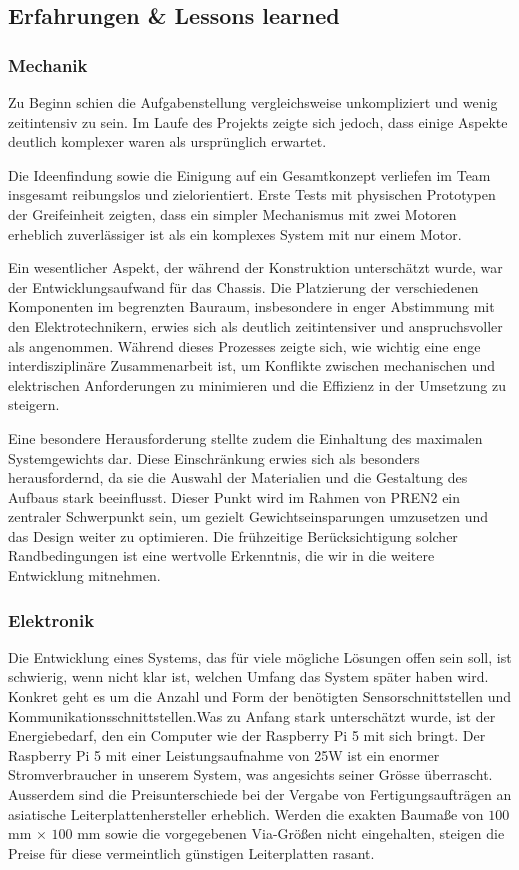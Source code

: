 \documentclass[main.tex]{subfiles} %
\begin{document}
\subsection{Erfahrungen \& Lessons learned}

\subsubsection{Mechanik}

Zu Beginn schien die Aufgabenstellung vergleichsweise unkompliziert und wenig 
zeitintensiv zu sein. Im Laufe des Projekts zeigte sich jedoch, dass einige 
Aspekte deutlich komplexer waren als ursprünglich erwartet.

Die Ideenfindung sowie die Einigung auf ein Gesamtkonzept verliefen im Team 
insgesamt reibungslos und zielorientiert. Erste Tests mit physischen Prototypen 
der Greifeinheit zeigten, dass ein simpler Mechanismus mit zwei Motoren erheblich 
zuverlässiger ist als ein komplexes System mit nur einem Motor.

Ein wesentlicher Aspekt, der während der Konstruktion unterschätzt wurde, war 
der Entwicklungsaufwand für das Chassis. Die Platzierung der verschiedenen 
Komponenten im begrenzten Bauraum, insbesondere in enger Abstimmung mit den 
Elektrotechnikern, erwies sich als deutlich zeitintensiver und anspruchsvoller 
als angenommen. Während dieses Prozesses zeigte sich, wie wichtig eine enge 
interdisziplinäre Zusammenarbeit ist, um Konflikte zwischen mechanischen und 
elektrischen Anforderungen zu minimieren und die Effizienz in der Umsetzung 
zu steigern.

Eine besondere Herausforderung stellte zudem die Einhaltung des maximalen 
Systemgewichts dar. Diese Einschränkung erwies sich als besonders 
herausfordernd, da sie die Auswahl der Materialien und die Gestaltung des 
Aufbaus stark beeinflusst. Dieser Punkt wird im Rahmen von PREN2 ein zentraler 
Schwerpunkt sein, um gezielt Gewichtseinsparungen umzusetzen und das Design 
weiter zu optimieren. Die frühzeitige Berücksichtigung solcher Randbedingungen 
ist eine wertvolle Erkenntnis, die wir in die weitere Entwicklung mitnehmen.


\subsubsection{Elektronik}
Die Entwicklung eines Systems, das für viele mögliche Lösungen offen sein soll,
ist schwierig, wenn nicht klar ist, welchen Umfang das System später haben
wird. Konkret geht es um die Anzahl und Form der benötigten
Sensorschnittstellen und Kommunikationsschnittstellen.Was zu Anfang stark
unterschätzt wurde, ist der Energiebedarf, den ein Computer wie der Raspberry
Pi 5 mit sich bringt. Der Raspberry Pi 5 mit einer Leistungsaufnahme von 25W
ist ein enormer Stromverbraucher in unserem System, was angesichts seiner
Grösse überrascht. Ausserdem sind die Preisunterschiede bei der Vergabe von
Fertigungsaufträgen an asiatische Leiterplattenhersteller erheblich. Werden die
exakten Baumaße von $100$ mm × $100$ mm sowie die vorgegebenen Via-Größen nicht
eingehalten, steigen die Preise für diese vermeintlich günstigen Leiterplatten rasant.
\end{document}
